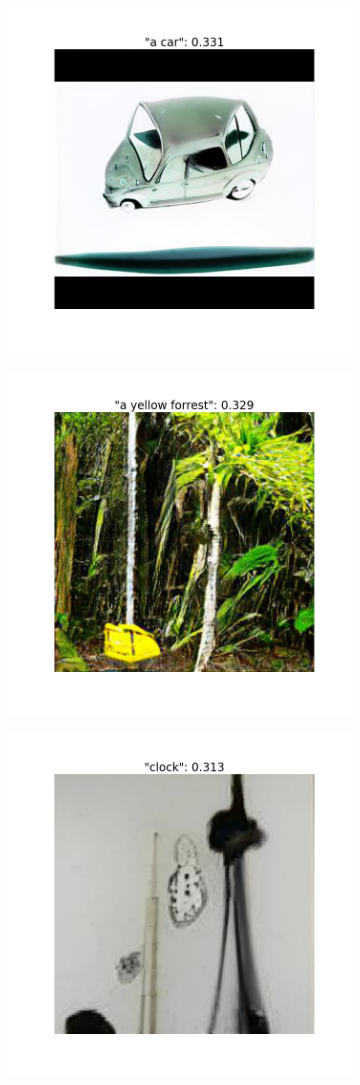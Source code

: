 \documentclass[12pt,a4paper,openany]{book}
\begin{document}
\begin{figure}[H]
\centering
\begin{subfigure}[b]{1\textwidth}
\centering
   \includegraphics[width=0.5\linewidth]{figs/a car_cossim.png}
\end{subfigure}

\begin{subfigure}[b]{1\textwidth}
\centering
   \includegraphics[width=0.5\linewidth]{a yellow forrest_cossim.png}
\end{subfigure}

\begin{subfigure}[b]{1\textwidth}
\centering
   \includegraphics[width=0.5\linewidth]{clock_cossim.png}
\end{subfigure}

\end{figure}
\end{document}
